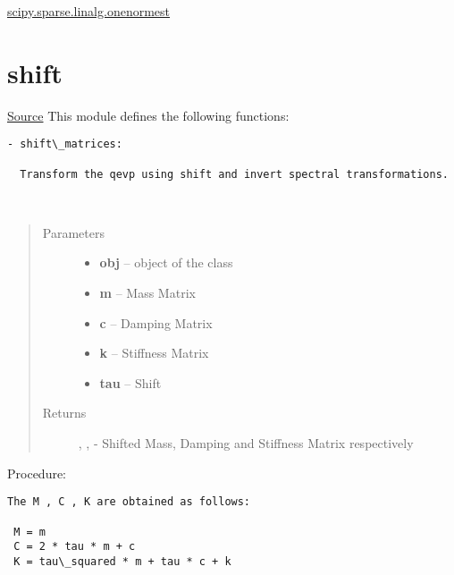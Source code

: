 \documentclass[letterpaper,10pt,english]{sphinxmanual}
\begin{document}
\href{http://docs.scipy.org/doc/scipy-dev/reference/generated/scipy.sparse.linalg.onenormest.html}{scipy.sparse.linalg.onenormest}




\section{shift}
\label{index:shift}
\href{https://bitbucket.org/akadar/brakesqueal0.1/src/10fdbd0824e88ebbee4f44cefa781c01e586db41/brake/initialize/shift.py?at=master}{Source}
\label{index:module-brake.initialize.shift}
This module defines the following functions:

\begin{Verbatim}[commandchars=\\\{\}]
- shift\_matrices:

  Transform the qevp using shift and invert spectral transformations.
\end{Verbatim}

\begin{fulllineitems}
\label{index:brake.initialize.shift.shift_matrices}~\begin{quote}\begin{description}
\item[{Parameters}] \leavevmode\begin{itemize}
\item {} 
\textbf{obj} -- object of the class 

\item {} 
\textbf{m} -- Mass Matrix

\item {} 
\textbf{c} -- Damping Matrix

\item {} 
\textbf{k} -- Stiffness Matrix

\item {} 
\textbf{tau} -- Shift

\end{itemize}

\item[{Returns}] \leavevmode
{}, ,  - Shifted Mass, Damping and Stiffness Matrix respectively

\end{description}\end{quote}

Procedure:

\begin{Verbatim}[commandchars=\\\{\}]
The M , C , K are obtained as follows:

 M = m
 C = 2 * tau * m + c
 K = tau\_squared * m + tau * c + k
\end{Verbatim}

\end{fulllineitems}
\end{document}
